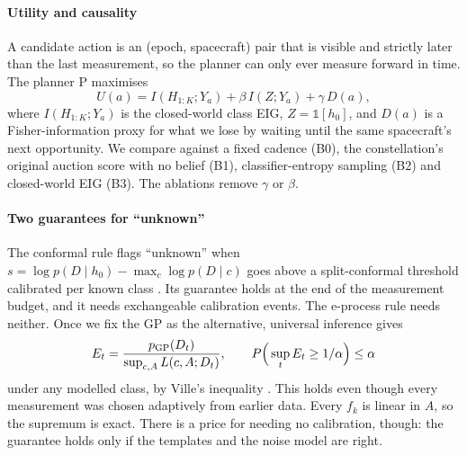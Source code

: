 \documentclass[final,5p,times,twocolumn,authoryear]{elsarticle}
\begin{document}
\paragraph{Utility and causality} A candidate action is an (epoch, spacecraft) pair that is visible and strictly later than the last measurement, so the planner can only ever measure forward in time. The planner P maximises
\begin{equation}
U(a) = I(H_{1:K};Y_a) + \beta\, I(Z;Y_a) + \gamma\, D(a),
\label{eq:utility}
\end{equation}
where $I(H_{1:K};Y_a)$ is the closed-world class EIG, $Z=\mathbb 1[h_0]$, and $D(a)$ is a Fisher-information proxy for what we lose by waiting until the same spacecraft's next opportunity. We compare against a fixed cadence (B0), the constellation's original auction score with no belief (B1), classifier-entropy sampling (B2) and closed-world EIG (B3). The ablations remove $\gamma$ or $\beta$.

\paragraph{Two guarantees for ``unknown''} The conformal rule flags ``unknown'' when $s=\log p(D\mid h_0)-\max_c\log p(D\mid c)$ goes above a split-conformal threshold calibrated per known class \citep{Vovk2005,Angelopoulos2023}. Its guarantee holds at the end of the measurement budget, and it needs exchangeable calibration events. The e-process rule needs neither. Once we fix the GP as the alternative, universal inference \citep{Wasserman2020} gives
\begin{equation}
E_t=\frac{p_{\rm GP}(D_t)}{\sup_{c,A}L(c,A;D_t)},\qquad P\Big(\sup_t E_t\ge 1/\alpha\Big)\le\alpha
\label{eq:eprocess}
\end{equation}
under any modelled class, by Ville's inequality \citep{Ramdas2023}. This holds even though every measurement was chosen adaptively from earlier data. Every $f_k$ is linear in $A$, so the supremum is exact. There is a price for needing no calibration, though: the guarantee holds only if the templates and the noise model are right.
\end{document}
